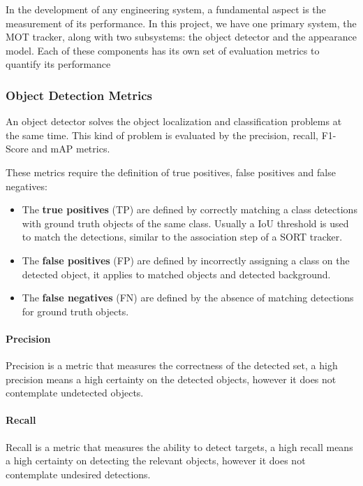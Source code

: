 
{
    In the development of any engineering system, a fundamental aspect is the measurement of its performance. 
    In this project, we have one primary system, the \ac{MOT} tracker, along with two subsystems: the object detector and the appearance model. 
    Each of these components has its own set of evaluation metrics to quantify its performance
}

\subsubsection{Object Detection Metrics}

{
    An object detector solves the object localization and classification problems at the same time. 
    This kind of problem is evaluated by the precision, recall, F1-Score and \ac{mAP} metrics.
}

{
    These metrics require the definition of true positives, false positives and false negatives:
}

\begin{itemize}
    \item The \textbf{true positives} (\acs{TP}) are defined by correctly matching a class detections with ground truth objects of the same class. Usually a \ac{IoU} threshold is used to match the detections, similar to the association step of a SORT tracker.
    \item The \textbf{false positives} (\acs{FP}) are defined by incorrectly assigning a class on the detected object, it applies to matched objects and detected background.
    \item The \textbf{false negatives} (\acs{FN}) are defined by the absence of matching detections for ground truth objects.
\end{itemize}

\paragraph{Precision}

{
    Precision is a metric that measures the correctness of the detected set, a high precision means a high certainty on the detected objects, however it does not contemplate undetected objects.
}

\paragraph{Recall}

{
    Recall is a metric that measures the ability to detect targets, a high recall means a high certainty on detecting the relevant objects, however it does not contemplate undesired detections.
}

